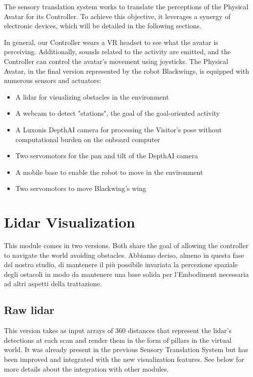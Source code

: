 \documentclass{Configuration_Files/PoliMi3i_thesis}
\begin{document}
The sensory translation system works to translate the perceptions of the Physical Avatar for its Controller. To achieve this objective, it leverages a synergy of electronic devices, which will be detailed in the following sections.

In general, our Controller wears a VR headset to see what the avatar is perceiving. Additionally, sounds related to the activity are emitted, and the Controller can control the avatar's movement using joysticks. The Physical Avatar, in the final version represented by the robot Blackwings, is equipped with numerous sensors and actuators:

\begin{itemize}
    \item A lidar for visualizing obstacles in the environment
    \item A webcam to detect "stations", the goal of the goal-oriented activity
    \item A Luxonis DepthAI camera for processing the Visitor's pose without computational burden on the onboard computer
    \item Two servomotors for the pan and tilt of the DepthAI camera
    \item A mobile base to enable the robot to move in the environment
    \item Two servomotors to move Blackwing's wing
\end{itemize}

\section{Lidar Visualization}

This module comes in two versions. Both share the goal of allowing the controller to navigate the world avoiding obstacles. Abbiamo deciso, almeno in questa fase del nostro studio, di mantenere il più possibile invariata la percezione spaziale degli ostacoli in modo da mantenere una base solida per l’Embodiment necessaria ad altri aspetti della trattazione.

\subsection{Raw lidar}

This version takes as input arrays of 360 distances that represent the lidar’s detections at each scan and render them in the form of pillars in the virtual world. It was already present in the previous Sensory Translation System but has been improved and integrated with the new visualization features. See below for more details about the integration with other modules.
\end{document}
